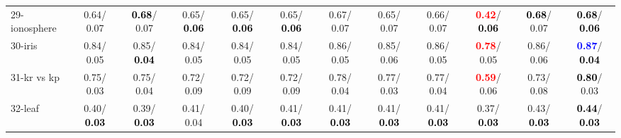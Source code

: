 \begin{table}[h]
\begin{center}
{\begin{tabular}{lc|c|c|c|c|c|c|c|c|c|c}
29-ionosphere &   0.64/  0.07 & \textcolor{black}{\textbf{  0.68}}/  0.07 &   0.65/\textcolor{black}{\textbf{  0.06}} &   0.65/\textcolor{black}{\textbf{  0.06}} &   0.65/\textcolor{black}{\textbf{  0.06}} &   0.67/  0.07 &   0.65/  0.07 &   0.66/  0.07 & \textcolor{red}{\textbf{  0.42}}/\textcolor{black}{\textbf{  0.06}} & \textcolor{black}{\textbf{  0.68}}/  0.07 & \textcolor{black}{\textbf{  0.68}}/\textcolor{black}{\textbf{  0.06}} \\
30-iris &   0.84/  0.05 &   0.85/\textcolor{black}{\textbf{  0.04}} &   0.84/  0.05 &   0.84/  0.05 &   0.84/  0.05 &   0.86/  0.05 &   0.85/  0.06 &   0.86/  0.05 & \textcolor{red}{\textbf{  0.78}}/  0.05 &   0.86/  0.06 & \textcolor{blue}{\textbf{  0.87}}/\textcolor{black}{\textbf{  0.04}} \\
31-kr vs kp &   0.75/  0.03 &   0.75/  0.04 &   0.72/  0.09 &   0.72/  0.09 &   0.72/  0.09 &   0.78/  0.04 &   0.77/  0.03 &   0.77/  0.04 & \textcolor{red}{\textbf{  0.59}}/  0.06 &   0.73/  0.08 & \textcolor{black}{\textbf{  0.80}}/  0.03 \\
32-leaf &   0.40/\textcolor{black}{\textbf{  0.03}} &   0.39/\textcolor{black}{\textbf{  0.03}} &   0.41/  0.04 &   0.40/\textcolor{black}{\textbf{  0.03}} &   0.41/\textcolor{black}{\textbf{  0.03}} &   0.41/\textcolor{black}{\textbf{  0.03}} &   0.41/\textcolor{black}{\textbf{  0.03}} &   0.41/\textcolor{black}{\textbf{  0.03}} &   0.37/\textcolor{black}{\textbf{  0.03}} &   0.43/\textcolor{black}{\textbf{  0.03}} & \textcolor{black}{\textbf{  0.44}}/\textcolor{black}{\textbf{  0.03}} \\\end{tabular}}\label{stratsALCKappa0aC4.5}
\end{center}
\end{table}
